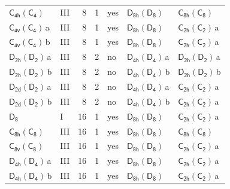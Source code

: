 \documentclass[10pt,a4paper]{article}
\numberwithin{equation}{section}
\newcommand{\grp}[1]{\mathsf{#1}}
\newcommand{\clsletter}[1]{\,{\scriptsize\color{black!55}#1}}
\begin{document}
{\begin{longtable}{@{}llrrlll@{}}
\href{C4h-C4.pdf}{$\grp{C_{4h}}(\grp{C_{4}})$} & III & 8 & 1 & yes & \href{D8h-D8.pdf}{$\grp{D_{8h}}(\grp{D_{8}})$} & \href{C8h-C8.pdf}{$\grp{C_{8h}}(\grp{C_{8}})$}\\
\href{C4v-C4.pdf}{$\grp{C_{4v}}(\grp{C_{4}})$}\clsletter{a} & III & 8 & 1 & yes & \href{D8h-D8.pdf}{$\grp{D_{8h}}(\grp{D_{8}})$} & \href{C2h-C2.pdf}{$\grp{C_{2h}}(\grp{C_{2}})$}\clsletter{a}\\
\href{C4v-C4.pdf}{$\grp{C_{4v}}(\grp{C_{4}})$}\clsletter{b} & III & 8 & 1 & yes & \href{D8h-D8.pdf}{$\grp{D_{8h}}(\grp{D_{8}})$} & \href{C2h-C2.pdf}{$\grp{C_{2h}}(\grp{C_{2}})$}\clsletter{a}\\
\href{D2h-D2.pdf}{$\grp{D_{2h}}(\grp{D_{2}})$}\clsletter{a} & III & 8 & 2 & no & \href{D4h-D4.pdf}{$\grp{D_{4h}}(\grp{D_{4}})$}\clsletter{a} & \href{D2h-D2.pdf}{$\grp{D_{2h}}(\grp{D_{2}})$}\clsletter{a}\\
\href{D2h-D2.pdf}{$\grp{D_{2h}}(\grp{D_{2}})$}\clsletter{b} & III & 8 & 2 & no & \href{D4h-D4.pdf}{$\grp{D_{4h}}(\grp{D_{4}})$}\clsletter{b} & \href{D2h-D2.pdf}{$\grp{D_{2h}}(\grp{D_{2}})$}\clsletter{b}\\
\href{D2d-D2.pdf}{$\grp{D_{2d}}(\grp{D_{2}})$}\clsletter{a} & III & 8 & 2 & no & \href{D4h-D4.pdf}{$\grp{D_{4h}}(\grp{D_{4}})$}\clsletter{a} & \href{C2h-C2.pdf}{$\grp{C_{2h}}(\grp{C_{2}})$}\clsletter{a}\\
\href{D2d-D2.pdf}{$\grp{D_{2d}}(\grp{D_{2}})$}\clsletter{b} & III & 8 & 2 & no & \href{D4h-D4.pdf}{$\grp{D_{4h}}(\grp{D_{4}})$}\clsletter{b} & \href{C2h-C2.pdf}{$\grp{C_{2h}}(\grp{C_{2}})$}\clsletter{a}\\
\href{../../../rotation/data/pdf/D8.pdf}{$\grp{D_{8}}$} & I & 16 & 1 & yes & \href{D8h-D8.pdf}{$\grp{D_{8h}}(\grp{D_{8}})$} & \href{C2h-C2.pdf}{$\grp{C_{2h}}(\grp{C_{2}})$}\clsletter{a}\\
\href{C8h-C8.pdf}{$\grp{C_{8h}}(\grp{C_{8}})$} & III & 16 & 1 & yes & \href{D8h-D8.pdf}{$\grp{D_{8h}}(\grp{D_{8}})$} & \href{C8h-C8.pdf}{$\grp{C_{8h}}(\grp{C_{8}})$}\\
\href{C8v-C8.pdf}{$\grp{C_{8v}}(\grp{C_{8}})$} & III & 16 & 1 & yes & \href{D8h-D8.pdf}{$\grp{D_{8h}}(\grp{D_{8}})$} & \href{C2h-C2.pdf}{$\grp{C_{2h}}(\grp{C_{2}})$}\clsletter{a}\\
\href{D4h-D4.pdf}{$\grp{D_{4h}}(\grp{D_{4}})$}\clsletter{a} & III & 16 & 1 & yes & \href{D8h-D8.pdf}{$\grp{D_{8h}}(\grp{D_{8}})$} & \href{C2h-C2.pdf}{$\grp{C_{2h}}(\grp{C_{2}})$}\clsletter{a}\\
\href{D4h-D4.pdf}{$\grp{D_{4h}}(\grp{D_{4}})$}\clsletter{b} & III & 16 & 1 & yes & \href{D8h-D8.pdf}{$\grp{D_{8h}}(\grp{D_{8}})$} & \href{C2h-C2.pdf}{$\grp{C_{2h}}(\grp{C_{2}})$}\clsletter{a}\\

\end{longtable}}
\end{document}
